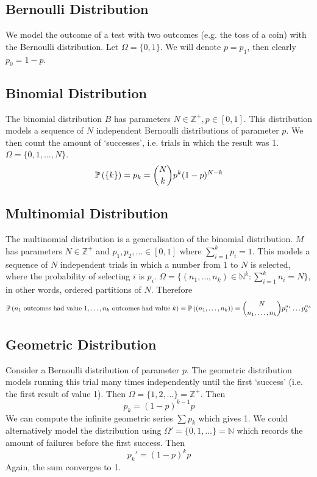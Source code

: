 \documentclass{article}
\begin{document}
\subsection{Bernoulli Distribution}
We model the outcome of a test with two outcomes (e.g. the toss of a coin) with the Bernoulli distribution. Let $\Omega = \{ 0, 1 \}$. We will denote $p = p_1$, then clearly $p_0 = 1 - p$.

\subsection{Binomial Distribution}
The binomial distribution $B$ has parameters $N \in \mathbb Z^+, p \in [0, 1]$. This distribution models a sequence of $N$ independent Bernoulli distributions of parameter $p$. We then count the amount of `successes', i.e. trials in which the result was 1. $\Omega = \{ 0, 1, \dots, N \}$.
\[ \mathbb{P}\left({\{ k \}}\right) = p_k = \binom{N}{k}p^k(1-p)^{N-k} \]

\subsection{Multinomial Distribution}
The multinomial distribution is a generalisation of the binomial distribution. $M$ has parameters $N \in \mathbb Z^+$ and $p_1, p_2, \dots \in [0, 1]$ where $\sum_{i=1}^k p_i = 1$. This models a sequence of $N$ independent trials in which a number from 1 to $N$ is selected, where the probability of selecting $i$ is $p_i$. $\Omega = \{ (n_1, \dots, n_k) \in \mathbb N^k \colon \sum_{i=1}^k n_i = N \}$, in other words, ordered partitions of $N$. Therefore
\[ \mathbb{P}\left({n_1 \text{ outcomes had value 1}, \dots, n_k \text{ outcomes had value }k}\right) = \mathbb{P}\left({(n_1, \dots, n_k)}\right) = \binom{N}{n_1,\dots,n_k}p_1^{n_1}\dots p_k^{n_k} \]

\subsection{Geometric Distribution}
Consider a Bernoulli distribution of parameter $p$. The geometric distribution models running this trial many times independently until the first `success' (i.e. the first result of value 1). Then $\Omega = \{ 1, 2, \dots \} = \mathbb Z^+$. Then
\[ p_k = (1-p)^{k-1}p \]
We can compute the infinite geometric series $\sum p_k$ which gives 1. We could alternatively model the distribution using $\Omega' = \{ 0, 1, \dots \} = \mathbb N$ which records the amount of failures before the first success. Then
\[ p_k' = (1-p)^k p \]
Again, the sum converges to 1.
\end{document}
